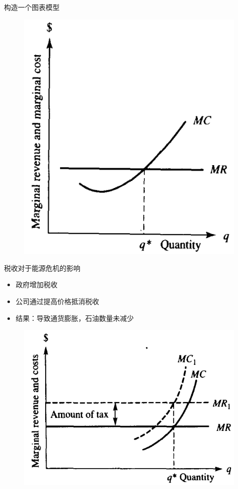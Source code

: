 \documentclass[mathserif, table]{beamer}
\begin{document}
\begin{frame}{构造一个图表模型}
\begin{figure}
    \includegraphics[height=.35\textheight]{mcr.png}
  \end{figure}

\end{frame}

\begin{frame}{税收对于能源危机的影响}
  \begin{itemize}
  \item 政府增加税收
  \item 公司通过提高价格抵消税收
  \item 结果：导致通货膨胀，石油数量未减少
  \end{itemize}

  \begin{figure}
    \centering
    \includegraphics[width=.5\textwidth]{taxshift.png}
  \end{figure}

\end{frame}
\end{document}
